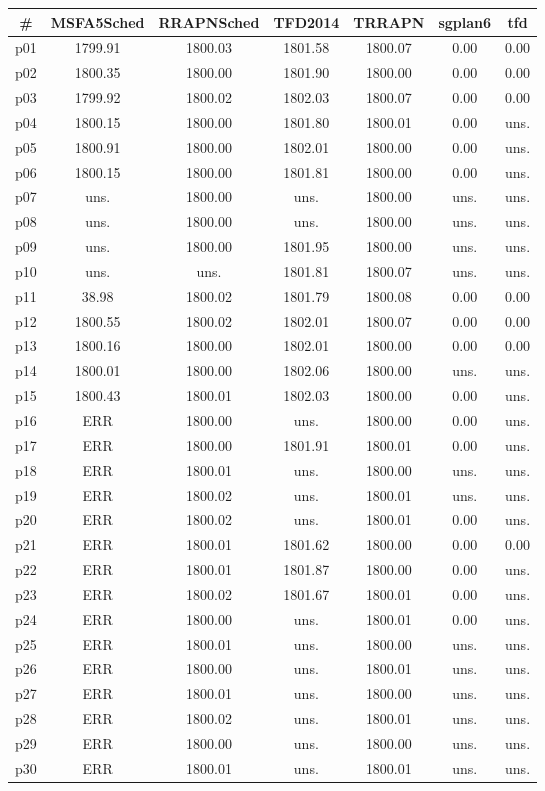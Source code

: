 \begin{tabular}{ccccccc}
\toprule
\textbf{\#} & \textbf{MSFA5Sched} & \textbf{RRAPNSched} & \textbf{TFD2014} & \textbf{TRRAPN} & \textbf{sgplan6} & \textbf{tfd}\\
\midrule
p01 & 1799.91 & 1800.03 & 1801.58 & 1800.07 & 0.00 & 0.00\\
p02 & 1800.35 & 1800.00 & 1801.90 & 1800.00 & 0.00 & 0.00\\
p03 & 1799.92 & 1800.02 & 1802.03 & 1800.07 & 0.00 & 0.00\\
p04 & 1800.15 & 1800.00 & 1801.80 & 1800.01 & 0.00 & uns.\\
p05 & 1800.91 & 1800.00 & 1802.01 & 1800.00 & 0.00 & uns.\\
p06 & 1800.15 & 1800.00 & 1801.81 & 1800.00 & 0.00 & uns.\\
p07 & uns. & 1800.00 & uns. & 1800.00 & uns. & uns.\\
p08 & uns. & 1800.00 & uns. & 1800.00 & uns. & uns.\\
p09 & uns. & 1800.00 & 1801.95 & 1800.00 & uns. & uns.\\
p10 & uns. & uns. & 1801.81 & 1800.07 & uns. & uns.\\
p11 & 38.98 & 1800.02 & 1801.79 & 1800.08 & 0.00 & 0.00\\
p12 & 1800.55 & 1800.02 & 1802.01 & 1800.07 & 0.00 & 0.00\\
p13 & 1800.16 & 1800.00 & 1802.01 & 1800.00 & 0.00 & 0.00\\
p14 & 1800.01 & 1800.00 & 1802.06 & 1800.00 & uns. & uns.\\
p15 & 1800.43 & 1800.01 & 1802.03 & 1800.00 & 0.00 & uns.\\
p16 & ERR & 1800.00 & uns. & 1800.00 & 0.00 & uns.\\
p17 & ERR & 1800.00 & 1801.91 & 1800.01 & 0.00 & uns.\\
p18 & ERR & 1800.01 & uns. & 1800.00 & uns. & uns.\\
p19 & ERR & 1800.02 & uns. & 1800.01 & uns. & uns.\\
p20 & ERR & 1800.02 & uns. & 1800.01 & 0.00 & uns.\\
p21 & ERR & 1800.01 & 1801.62 & 1800.00 & 0.00 & 0.00\\
p22 & ERR & 1800.01 & 1801.87 & 1800.00 & 0.00 & uns.\\
p23 & ERR & 1800.02 & 1801.67 & 1800.01 & 0.00 & uns.\\
p24 & ERR & 1800.00 & uns. & 1800.01 & 0.00 & uns.\\
p25 & ERR & 1800.01 & uns. & 1800.00 & uns. & uns.\\
p26 & ERR & 1800.00 & uns. & 1800.01 & uns. & uns.\\
p27 & ERR & 1800.01 & uns. & 1800.00 & uns. & uns.\\
p28 & ERR & 1800.02 & uns. & 1800.01 & uns. & uns.\\
p29 & ERR & 1800.00 & uns. & 1800.00 & uns. & uns.\\
p30 & ERR & 1800.01 & uns. & 1800.01 & uns. & uns.\\
\bottomrule
\end{tabular}

